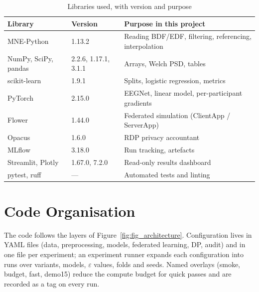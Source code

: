 \documentclass[12pt,a4paper,oneside]{report}
\begin{document}
\begin{table}[!htbp]\centering\small{}
\caption{Libraries used, with version and purpose}\label{tab:tools}
\begin{tabularx}{\textwidth}{llX}
\toprule
Library & Version & Purpose in this project\\
\midrule
MNE-Python \cite{mne} & 1.13.2 & Reading BDF/EDF, filtering, referencing, interpolation\\
NumPy, SciPy, pandas & 2.2.6, 1.17.1, 3.1.1 & Arrays, Welch PSD, tables\\
scikit-learn \cite{sklearn} & 1.9.1 & Splits, logistic regression, metrics\\
PyTorch \cite{torch} & 2.15.0 & EEGNet, linear model, per-participant gradients\\
Flower \cite{flower} & 1.44.0 & Federated simulation (ClientApp / ServerApp)\\
Opacus \cite{opacus} & 1.6.0 & RDP privacy accountant\\
MLflow \cite{mlflow} & 3.18.0 & Run tracking, artefacts\\
Streamlit, Plotly & 1.67.0, 7.2.0 & Read-only results dashboard\\
pytest, ruff & --- & Automated tests and linting\\
\bottomrule
\end{tabularx}
\end{table}

\section{Code Organisation}
The code follows the layers of Figure~\ref{fig:fig_architecture}. Configuration lives in YAML files (data, preprocessing, models, federated learning, DP, audit) and in one file per experiment; an experiment runner expands each configuration into runs over variants, models, $\varepsilon$ values, folds and seeds. Named overlays (smoke, budget, fast, demo15) reduce the compute budget for quick passes and are recorded as a tag on every run.
\end{document}
